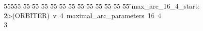 %
%
\begin{tabbing}
55555 \= 55 \= 55 \= 55 \= 55 \= 55 \= 55 \= 55 \= 55 \= 55 \= 55 \= 55 \= 55 \= \>max\_arc\_16\_4\_start:\\[0pt]
2\>$\triangleright$\>(ORBITER)\ v\ 4\ maximal\_arc\_parameters\ 16\ 4\\[0pt]
3\>\end{tabbing}
